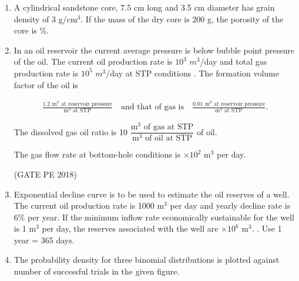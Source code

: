 \documentclass[journal,12pt,onecolumn]{IEEEtran}
\theoremstyle{remark}
\begin{document}
\begin{enumerate}
\item A cylindrical sandstone core, 7.5 cm long and 3.5 cm diameter has grain density of 3 g/cm$^3$. If the mass of the dry core is 200 g, the porosity of the core is \underline{\hspace{3cm}} \%.\\

\hfill{}

\item In an oil reservoir the current average pressure is below bubble point pressure of the oil. The current oil production rate is $10^3$ $m^3$/day and total gas production rate is $10^5$ $m^3$/day at STP conditions . The formation volume factor of the oil is

\begin{align*}
\frac{1.2 \text{ m}^3 \text{ at reservoir pressure}}{\text{m}^3 \text{ at STP}} \quad \text{and that of gas is} \quad \frac{0.01 \text{ m}^3 \text{ at reservoir pressure}}{\text{m}^3 \text{ at STP}}.
\end{align*}

The dissolved gas oil ratio is 10 $\dfrac{\text{m}^3 \text{ of gas at STP}}{\text{m}^3 \text{ of oil at STP}}$ of oil.

The gas flow rate at bottom-hole conditions is \underline{\hspace{1.5cm}} $\times 10^2$ m$^3$ per day.\\ 

\hfill(GATE PE 2018)

\item Exponential decline curve is to be used to estimate the oil reserves of a well. The current oil production rate is 1000 m$^3$ per day and yearly decline rate is 6\% per year. If the minimum inflow rate economically sustainable for the well is 1 m$^3$ per day, the reserves  associated with the well are \underline{\hspace{2cm}} $\times 10^6$ m$^3$. . Use 1 year = 365 days.

\hfill{}

\pagebreak

\item The probability density for three binomial distributions  is plotted against
number of successful trials in the given figure.


\end{enumerate}
\end{document}
